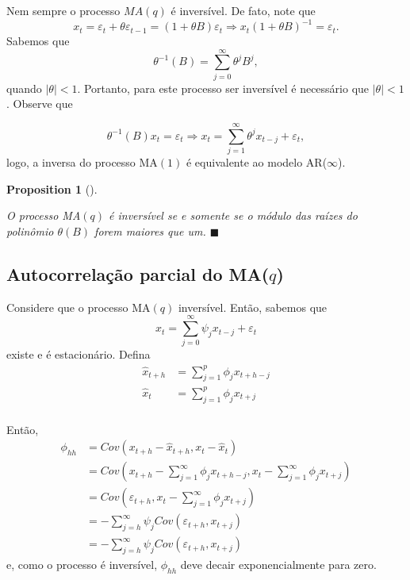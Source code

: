 \documentclass[
  letterpaper,
  DIV=11,
  numbers=noendperiod]{scrartcl}
\theoremstyle{plain}
\theoremstyle{plain}
\newtheorem{proposition}{Proposition}[chapter]
\theoremstyle{definition}
\theoremstyle{definition}
\theoremstyle{remark}
\begin{document}
Nem sempre o processo \(MA(q)\) é inversível. De fato, note que
\[x_t=\varepsilon_t +\theta\varepsilon_{t-1}=(1+\theta B)\varepsilon_t\Rightarrow x_t(1+\theta B)^{-1}=\varepsilon_t.\]
Sabemos que \[\theta^{-1}(B)=\sum_{j=0}^{\infty}\theta^j B^j,\] quando
\(|\theta|<1\). Portanto, para este processo ser inversível é necessário
que \(|\theta|<1\). Observe que

\[\theta^{-1}(B)x_t=\varepsilon_t\Rightarrow x_t=\sum_{j=1}^\infty \theta^j x_{t-j}+\varepsilon_t,\]
logo, a inversa do processo MA\((1)\) é equivalente ao modelo
AR(\(\infty\)).

\begin{proposition}[]\protect\hypertarget{prp-}{}\label{prp-}

O processo MA\((q)\) é inversível se e somente se o módulo das raízes do
polinômio \(\theta(B)\) forem maiores que um. \(\blacksquare\)

\end{proposition}

\hypertarget{autocorrelauxe7uxe3o-parcial-do-maq}{%
\subsection{\texorpdfstring{Autocorrelação parcial do
MA(\(q\))}{Autocorrelação parcial do MA(q)}}\label{autocorrelauxe7uxe3o-parcial-do-maq}}

Considere que o processo MA\((q)\) inversível. Então, sabemos que
\[x_t=\sum_{j=0}^\infty\psi_j x_{t-j}+\varepsilon_t \] existe e é
estacionário. Defina \[\begin{align}
\hat{x}_{t+h}&=\sum_{j=1}^p\phi_j x_{t+h-j}\\
\hat{x}_{t}&=\sum_{j=1}^p\phi_j x_{t+j}\\
\end{align}\]

Então,
\[\begin{align}\phi_{hh}&=Cov(x_{t+h}-\hat{x}_{t+h},x_t-\hat{x}_t)\\
&=Cov\left(x_{t+h}-\sum_{j=1}^\infty\phi_j x_{t+h-j},x_t- \sum_{j=1}^\infty\phi_j x_{t+j}\right)\\&=Cov\left(\varepsilon_{t+h},x_t- \sum_{j=1}^\infty\phi_j x_{t+j}\right)\\&=-\sum_{j=h}^\infty\psi_jCov(\varepsilon_{t+h},x_{t+j})\\&=-\sum_{j=h}^\infty\psi_jCov(\varepsilon_{t+h},x_{t+j})\end{align}\]
e, como o processo é inversível, \(\phi_{hh}\) deve decair
exponencialmente para zero.
\end{document}
